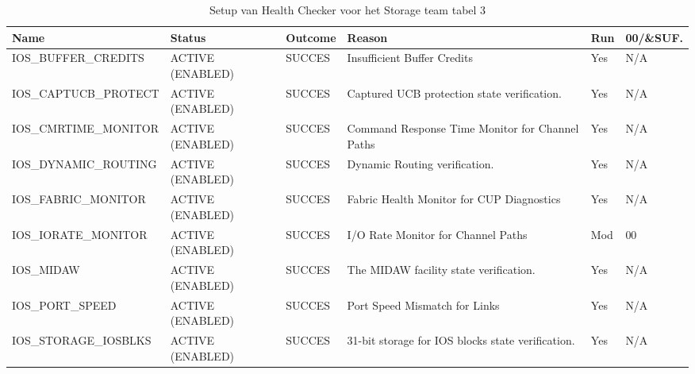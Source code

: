 \begin{landscape}
	\begin{table}[h]
		\begin{tabular}{|l|p{2.3cm}|l|p{4.5cm}|l|l|}
			\hline
			\textbf{Name}                       & \textbf{Status}   & \textbf{Outcome} & \textbf{Reason}    & \textbf{Run} &	\textbf{00/\&SUF.} \\ \hline
			IOS\_BUFFER\_CREDITS  & ACTIVE (ENABLED) & SUCCES & Insufficient   Buffer Credits                       & Yes & N/A \\ \hline
			IOS\_CAPTUCB\_PROTECT & ACTIVE (ENABLED) & SUCCES & Captured   UCB protection state verification.       & Yes & N/A \\ \hline
			IOS\_CMRTIME\_MONITOR & ACTIVE (ENABLED) & SUCCES & Command   Response Time Monitor for Channel Paths   & Yes & N/A \\ \hline
			IOS\_DYNAMIC\_ROUTING & ACTIVE (ENABLED) & SUCCES & Dynamic   Routing verification.                     & Yes & N/A \\ \hline
			IOS\_FABRIC\_MONITOR  & ACTIVE (ENABLED) & SUCCES & Fabric   Health Monitor for CUP Diagnostics         & Yes & N/A \\ \hline
			IOS\_IORATE\_MONITOR  & ACTIVE (ENABLED) & SUCCES & I/O   Rate Monitor for Channel Paths                & Mod & 00  \\ \hline
			IOS\_MIDAW            & ACTIVE (ENABLED) & SUCCES & The   MIDAW facility state verification.            & Yes & N/A \\ \hline
			IOS\_PORT\_SPEED      & ACTIVE (ENABLED) & SUCCES & Port   Speed Mismatch for Links                     & Yes & N/A \\ \hline
			IOS\_STORAGE\_IOSBLKS & ACTIVE (ENABLED) & SUCCES & 31-bit   storage for IOS blocks state verification. & Yes & N/A \\ \hline
		\end{tabular}
		\caption[Health Checker Storage team tabel 3]{Setup van Health Checker voor het Storage team tabel 3}
		\label{tbl:Storage Team Tabel 3}
	\end{table}
\end{landscape}

